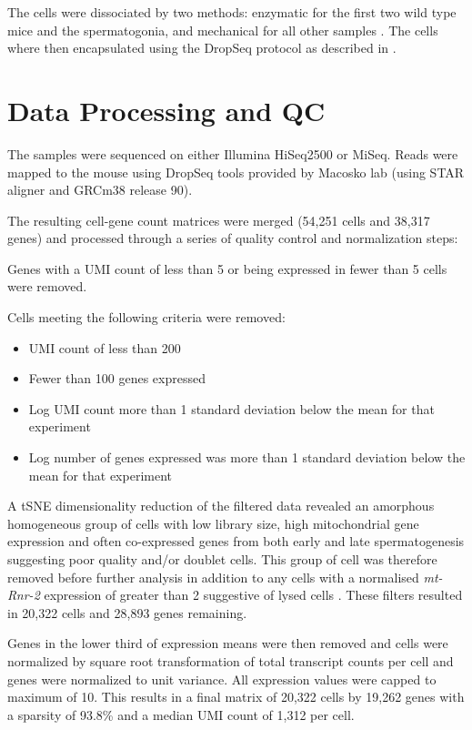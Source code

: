 The cells were dissociated by two methods: enzymatic for the first two wild type mice and the spermatogonia, and mechanical for all other samples \cite{Lima2017Standardized,Jung2019Unified}. The cells where then encapsulated using the DropSeq protocol \cite{Macosko2015Highly} as described in \cite{Jung2019Unified}.


\section{Data Processing and QC}

The samples were sequenced on either Illumina HiSeq2500 or MiSeq. Reads were mapped to the mouse using DropSeq tools provided by Macosko lab (using STAR aligner and GRCm38 release 90).

The resulting cell-gene count matrices were merged (54,251 cells and 38,317 genes) and processed through a series of quality control and normalization steps:

Genes with a UMI count of less than 5 or being expressed in fewer than 5 cells were removed.

Cells meeting the following criteria were removed:
\begin{itemize}
\item UMI count of less than 200
\item Fewer than 100 genes expressed
\item Log UMI count more than 1 standard deviation below the mean for that experiment
\item Log number of genes expressed was more than 1 standard deviation below the mean for that experiment
\end{itemize}

A tSNE dimensionality reduction of the filtered data revealed an amorphous homogeneous group of cells with low library size, high mitochondrial gene expression and often co-expressed genes from both early and late spermatogenesis suggesting poor quality and/or doublet cells. This group of cell was therefore removed before further analysis in addition to any cells with a normalised \textit{mt-Rnr-2} expression of greater than 2 suggestive of lysed cells \cite{Ilicic2016Classification}. These filters resulted in 20,322 cells and 28,893 genes remaining.

Genes in the lower third of expression means were then removed and cells were normalized by square root transformation of total transcript counts per cell and genes were normalized to unit variance. All expression values were capped to maximum of 10. This results in a final matrix of 20,322 cells by 19,262 genes with a sparsity of 93.8\% and a median UMI count of 1,312 per cell.


